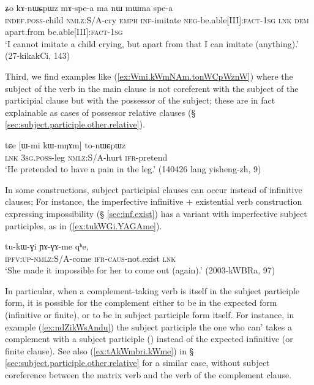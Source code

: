 \begin{exe}
\ex \label{ex:tApAtso.kWGAwu.kAnWCpWz}
  ʑo kɤ-nɯɕpɯz mɤ-spe-a ma nɯ mɯma spe-a \\
 \textsc{indef}.\textsc{poss}-child \textsc{nmlz}:S/A-cry \textsc{emph} \textsc{inf}-imitate \textsc{neg}-be.able[III]:\textsc{fact}-\textsc{1sg} \textsc{lnk} \textsc{dem} apart.from be.able[III]:\textsc{fact}-\textsc{1sg} \\
\glt `I cannot imitate a child crying, but apart from that I can imitate (anything).' (27-kikakCi, 143)
\end{exe}

Third, we find examples like (\ref{ex:Wmi.kWmNAm.tonWCpWznW}) where the subject of the verb in the main clause is not coreferent with the subject of the participial clause but with the possessor of the subject; these are in fact explainable as cases of possessor relative clauses (§ \ref{sec:subject.participle.other.relative}).

\begin{exe}
\ex \label{ex:Wmi.kWmNAm.tonWCpWznW}
 \gll  tɕe [ɯ-mi kɯ-mŋɤm] to-nɯɕpɯz  \\
 \textsc{lnk} \textsc{3sg}.\textsc{poss}-leg \textsc{nmlz}:S/A-hurt \textsc{ifr}-pretend \\
 \glt `He pretended to have a pain in the leg.' (140426 lang yisheng-zh, 9)
\end{exe}

In some constructions, subject participial clauses can occur instead of infinitive clauses; For instance, the imperfective  infinitive + existential verb construction expressing impossibility (§ \ref{sec:inf.exist}) has a variant with imperfective subject participles, as in (\ref{ex:tukWGi.YAGAme}). 

 \begin{exe}
\ex \label{ex:tukWGi.YAGAme}
 \gll   tu-kɯ-ɣi ɲɤ-ɣɤ-me qʰe,  \\
  \textsc{ipfv}:\textsc{up}-\textsc{nmlz}:S/A-come \textsc{ifr}-\textsc{caus}-not.exist \textsc{lnk} \\
  \glt `She made it impossible for her to come out (again).' (2003-kWBRa, 97)
 \end{exe}
 
In particular, when a complement-taking verb is itself in the subject participle form, it is possible for the complement either to be in the expected form (infinitive or finite), or to be in subject participle form itself. For instance, in example (\ref{ex:ndZikWsAndu}) the subject participle   the one who can' takes a complement with a subject participle () instead of the expected  infinitive (or finite clause). See also (\ref{ex:tAkWmbri.kWme}) in § \ref{sec:subject.participle.other.relative} for a similar case, without subject coreference between the matrix verb and the verb of the complement clause.

